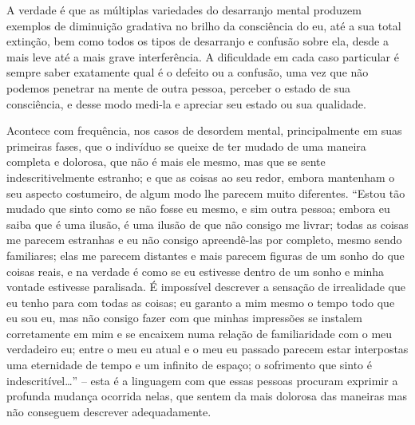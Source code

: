 A verdade é que as múltiplas variedades do desarranjo mental produzem
exemplos de diminuição gradativa no brilho da consciência do eu, até a
sua total extinção, bem como todos os tipos de desarranjo e confusão
sobre ela, desde a mais leve até a mais grave interferência.  A
dificuldade em cada caso particular é sempre saber exatamente qual é o
defeito ou a confusão, uma vez que não podemos penetrar na mente de
outra pessoa, perceber o estado de sua consciência, e desse modo
medi-la e apreciar seu estado ou sua qualidade.

Acontece com frequência, nos casos de desordem mental, principalmente em
suas primeiras fases, que o indivíduo se queixe de ter mudado de uma
maneira completa e dolorosa, que não é mais ele mesmo, mas que se sente
indescritivelmente estranho; e que as coisas ao seu redor, embora
mantenham o seu aspecto costumeiro, de algum modo lhe parecem muito
diferentes.  “Estou tão mudado que sinto como se não fosse eu mesmo, e
sim outra pessoa; embora eu saiba que é uma ilusão, é uma ilusão de que
não consigo me livrar; todas as coisas me parecem estranhas e eu não
consigo apreendê-las por completo, mesmo sendo familiares; elas
me parecem distantes e mais parecem figuras de um sonho do que coisas
reais, e na verdade é como se eu estivesse dentro de um sonho e minha
vontade estivesse paralisada.  É impossível descrever a sensação de
irrealidade que eu tenho para com todas as coisas; eu garanto a mim
mesmo o tempo todo que eu sou eu, mas não consigo fazer com que minhas
impressões se instalem corretamente em mim e se encaixem numa relação
de familiaridade com o meu verdadeiro eu; entre o meu eu atual e o meu
eu passado parecem estar interpostas uma eternidade de tempo e um
infinito de espaço; o sofrimento que sinto é indescritível\ldots{}” -- esta é
a linguagem com que essas pessoas procuram exprimir a profunda mudança
ocorrida nelas, que sentem da mais dolorosa das maneiras mas não
conseguem descrever adequadamente.


